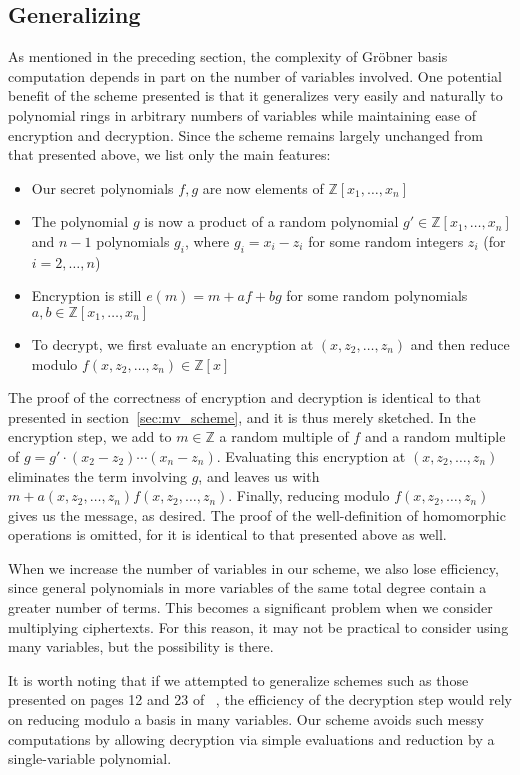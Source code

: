 \documentclass[11pt]{report}
\newcommand{\Z}{\mathbb{Z}}
\newcommand{\Zx}{\mathbb{Z}[x]}
\newcommand{\Zxn}{\mathbb{Z}[x_1,\ldots,x_n]}
\begin{document}
\subsection{Generalizing}
\label{sec:mv_generalizing}
As mentioned in the preceding section, the complexity of Gr\"obner basis computation depends in part on the number of variables involved. One potential benefit of the scheme presented is that it generalizes very easily and naturally to polynomial rings in arbitrary numbers of variables while maintaining ease of encryption and decryption. Since the scheme remains largely unchanged from that presented above, we list only the main features:

\begin{itemize}
\item Our secret polynomials $f,g$ are now elements of $\Zxn$
\item The polynomial $g$ is now a product of a random polynomial $g'\in \Zxn$ and $n-1$ polynomials $g_i$, where $g_i=x_i-z_i$ for some random integers $z_i$ (for $i=2,\dots,n$)
\item Encryption is still $e(m)=m+af+bg$ for some random polynomials $a,b\in \Zxn$
\item To decrypt, we first evaluate an encryption at $(x,z_2,\dots,z_n)$ and then reduce modulo $f(x,z_2,\dots,z_n) \in \Zx$
\end{itemize}

The proof of the correctness of encryption and decryption is identical to that presented in section~\ref{sec:mv_scheme}, and it is thus merely sketched. In the encryption step, we add to $m\in \Z$ a random multiple of $f$ and a random multiple of $g=g'\cdot(x_2-z_2)\cdots(x_n-z_n)$. Evaluating this encryption at $(x,z_2,\dots,z_n)$ eliminates the term involving $g$, and leaves us with $m+a(x,z_2,\dots,z_n)f(x,z_2,\dots,z_n)$. Finally, reducing modulo $f(x,z_2,\dots,z_n)$ gives us the message, as desired. The proof of the well-definition of homomorphic operations is omitted, for it is identical to that presented above as well.

When we increase the number of variables in our scheme, we also lose efficiency, since general polynomials in more variables of the same total degree contain a greater number of terms. This becomes a significant problem when we consider multiplying ciphertexts. For this reason, it may not be practical to consider using many variables, but the possibility is there.

It is worth noting that if we attempted to generalize schemes such as those presented on pages 12 and 23 of ~\cite{polly-cracker-revisited}, the efficiency of the decryption step would rely on reducing modulo a basis in many variables. Our scheme avoids such messy computations by allowing decryption via simple evaluations and reduction by a single-variable polynomial.
\end{document}
